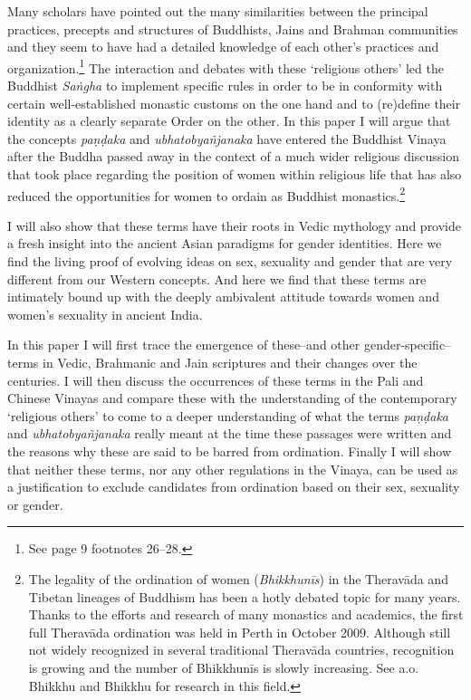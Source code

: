 Many scholars have pointed out the many similarities between the principal practices, precepts and structures of Buddhists, Jains and Brahman communities and they seem to have had a detailed knowledge of each other's practices and organization.\footnote{See \cite{maes2016} page 9 footnotes 26–28.} The interaction and debates with these `religious others' led the Buddhist {\em Saṅgha} to implement specific rules in order to be in conformity with certain well-established monastic customs on the one hand and to (re)define their identity as a clearly separate Order on the other. In this paper I will argue that the concepts {\em paṇḍaka} and {\em ubhatob­yañ­janaka} have entered the Buddhist Vinaya after the Buddha passed away in the context of a much wider religious discussion that took place regarding the position of women within religious life that has also reduced the opportunities for women to ordain as Buddhist monastics.\footnote{The legality of the ordination of women ({\em Bhikkhunīs}) in the Theravāda and Tibetan lineages of Buddhism has been a hotly debated topic for many years. Thanks to the efforts and research of many monastics and academics, the first full Theravāda ordination was held in Perth in October 2009. Although still not widely recognized in several traditional Theravāda countries, recognition is growing and the number of Bhikkhunīs is slowly increasing. See a.o. Bhikkhu \cite{sujato2009} and Bhikkhu \cite{analayo2013} for research in this field.}

I will also show that these terms have their roots in Vedic mythology and provide a fresh insight into the ancient Asian paradigms for gender identities. Here we find the living proof of evolving ideas on sex, sexuality and gender that are very different from our Western concepts. And here we find that these terms are intimately bound up with the deeply ambivalent attitude towards women and women's sexuality in ancient India.

In this paper I will first trace the emergence of these--and other gender-specific--terms in Vedic, Brahmanic and Jain scriptures and their changes over the centuries. I will then discuss the occurrences of these terms in the Pali and Chinese Vinayas and compare these with the understanding of the contemporary `religious others' to come to a deeper understanding of what the terms {\em paṇḍaka} and {\em ubhatob­yañ­janaka} really meant at the time these passages were written and the reasons why these are said to be barred from ordination. Finally I will show that neither these terms, nor any other regulations in the Vinaya, can be used as a justification to exclude candidates from ordination based on their sex, sexuality or gender.
